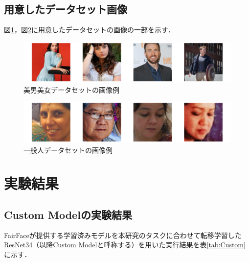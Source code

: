 \documentclass[a4paper,11pt,titlepage]{jsarticle}
\begin{document}
\subsection{用意したデータセット画像}
図\ref{fig:good_ex}，図\ref{fig:normal_ex}に用意したデータセットの画像の一部を示す．
\begin{figure}[H]
    \centering
    \includegraphics[width=1.1\textwidth]{ex_good_dataset.png}
    \caption{美男美女データセットの画像例}
    \label{fig:good_ex}
\end{figure}
\begin{figure}[H]
    \centering
    \includegraphics[width=1.1\textwidth]{ex_normal_dataset.png}
    \caption{一般人データセットの画像例}
    \label{fig:normal_ex}
\end{figure}


\clearpage
\section{実験結果}
\label{label:実験結果}
\subsection{Custom Modelの実験結果}
FairFaceが提供する学習済みモデルを本研究のタスクに合わせて転移学習したResNet34（以降Custom Modelと呼称する）を用いた実行結果を表\ref{tab:Custom}に示す．
\end{document}
